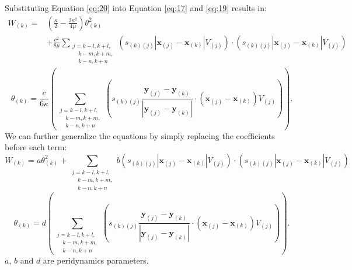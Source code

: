 \documentclass[11pt,fullpage]{article}
\newcommand{\mb}[1]{\mathbf{#1}}
\newcommand{\blue}[1]{#1}
\begin{document}
Substituting Equation \blue{\ref{eq:20}} into Equation \blue{\ref{eq:17}} and \blue{\ref{eq:19}} results in:
\begin{equation}
\begin{aligned}
W_{(k)} =& (\frac{\kappa}{2} -\frac{3\kappa^2}{4\mu})\theta_{(k)}^2 \\
         &+\frac{c^2}{8\mu}\sum_{\substack {j=k-l,k+l,\\ \quad k-m,k+m,\\ \quad k-n,k+n}}(s_{(k)(j)}|\mb{x}_{(j)}-\mb{x}_{(k)}|V_{(j)})\cdot(s_{(k)(j)}|\mb{x}_{(j)}-\mb{x}_{(k)}|V_{(j)})
\end{aligned}
\label{eq:22}
\end{equation}
\begin{equation}
\theta_{(k)} = \frac{c}{6\kappa}\left(\sum_{\substack {j=k-l,k+l,\\ \quad k-m,k+m,\\ \quad k-n,k+n}}\left(s_{(k)(j)}\frac{\mb{y}_{(j)} - \mb{y}_{(k)}}{|\mb{y}_{(j)} - \mb{y}_{(k)}|}\cdot(\mb{x}_{(j)}-\mb{x}_{(k)})V_{(j)}\right)\right).
\label{eq:23}
\end{equation}
We can further generalize the equations by simply replacing the coefficients before each term:
\begin{equation}
W_{(k)} = a\theta_{(k)}^2 + \sum_{\substack {j=k-l,k+l,\\ \quad k-m,k+m,\\ \quad k-n,k+n}}b(s_{(k)(j)}|\mb{x}_{(j)}-\mb{x}_{(k)}|V_{(j)})\cdot(s_{(k)(j)}|\mb{x}_{(j)}-\mb{x}_{(k)}|V_{(j)})
\label{eq:24}
\end{equation}
\begin{equation}
\theta_{(k)} = d\left(\sum_{\substack {j=k-l,k+l,\\ \quad k-m,k+m,\\ \quad k-n,k+n}}\left(s_{(k)(j)}\frac{\mb{y}_{(j)} - \mb{y}_{(k)}}{|\mb{y}_{(j)} - \mb{y}_{(k)}|}\cdot(\mb{x}_{(j)}-\mb{x}_{(k)})V_{(j)}\right)\right).
\label{eq:25}
\end{equation}
$a$, $b$ and $d$ are peridynamics parameters.
\end{document}

